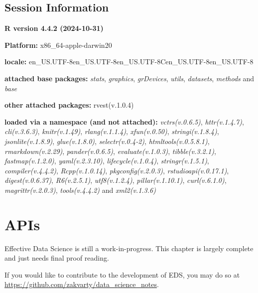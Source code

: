 \documentclass[
  letterpaper,
  DIV=11,
  numbers=noendperiod]{scrreprt}
\begin{document}
\section{Session Information}\label{session-information-4}

\textbf{R version 4.4.2 (2024-10-31)}

\textbf{Platform:} x86\_64-apple-darwin20

\textbf{locale:}
en\_US.UTF-8\textbar\textbar en\_US.UTF-8\textbar\textbar en\_US.UTF-8\textbar\textbar C\textbar\textbar en\_US.UTF-8\textbar\textbar en\_US.UTF-8

\textbf{attached base packages:} \emph{stats}, \emph{graphics},
\emph{grDevices}, \emph{utils}, \emph{datasets}, \emph{methods} and
\emph{base}

\textbf{other attached packages:} rvest(v.1.0.4)

\textbf{loaded via a namespace (and not attached):}
\emph{vctrs(v.0.6.5)}, \emph{httr(v.1.4.7)}, \emph{cli(v.3.6.3)},
\emph{knitr(v.1.49)}, \emph{rlang(v.1.1.4)}, \emph{xfun(v.0.50)},
\emph{stringi(v.1.8.4)}, \emph{jsonlite(v.1.8.9)}, \emph{glue(v.1.8.0)},
\emph{selectr(v.0.4-2)}, \emph{htmltools(v.0.5.8.1)},
\emph{rmarkdown(v.2.29)}, \emph{pander(v.0.6.5)},
\emph{evaluate(v.1.0.3)}, \emph{tibble(v.3.2.1)},
\emph{fastmap(v.1.2.0)}, \emph{yaml(v.2.3.10)},
\emph{lifecycle(v.1.0.4)}, \emph{stringr(v.1.5.1)},
\emph{compiler(v.4.4.2)}, \emph{Rcpp(v.1.0.14)},
\emph{pkgconfig(v.2.0.3)}, \emph{rstudioapi(v.0.17.1)},
\emph{digest(v.0.6.37)}, \emph{R6(v.2.5.1)}, \emph{utf8(v.1.2.4)},
\emph{pillar(v.1.10.1)}, \emph{curl(v.6.1.0)}, \emph{magrittr(v.2.0.3)},
\emph{tools(v.4.4.2)} and \emph{xml2(v.1.3.6)}

\chapter{APIs}\label{data-apis}

\begin{tcolorbox}[enhanced jigsaw, leftrule=.75mm, bottomtitle=1mm, toprule=.15mm, colbacktitle=quarto-callout-note-color!10!white, breakable, colback=white, bottomrule=.15mm, opacityback=0, colframe=quarto-callout-note-color-frame, title=\textcolor{quarto-callout-note-color}{\faInfo}\hspace{0.5em}{Note}, titlerule=0mm, toptitle=1mm, opacitybacktitle=0.6, arc=.35mm, rightrule=.15mm, coltitle=black, left=2mm]

Effective Data Science is still a work-in-progress. This chapter is
largely complete and just needs final proof reading.

If you would like to contribute to the development of EDS, you may do so
at \url{https://github.com/zakvarty/data_science_notes}.

\end{tcolorbox}
\end{document}
